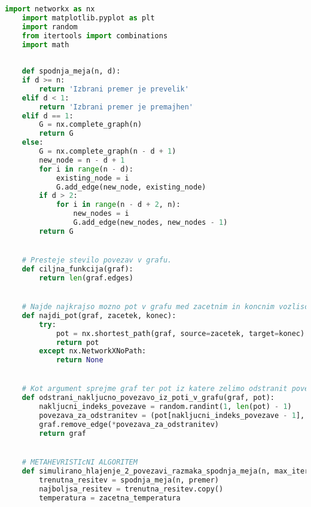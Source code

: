 \documentclass[12pt,a4paper]{amsart}
\theoremstyle{definition} %
\theoremstyle{plain} %
\begin{document}
\begin{lstlisting}[language=Python]
    import networkx as nx
    import matplotlib.pyplot as plt
    import random
    from itertools import combinations
    import math
    
    
    def spodnja_meja(n, d):
    if d >= n:
        return 'Izbrani premer je prevelik'
    elif d < 1:
        return 'Izbrani premer je premajhen'
    elif d == 1:
        G = nx.complete_graph(n)
        return G
    else:
        G = nx.complete_graph(n - d + 1)
        new_node = n - d + 1
        for i in range(n - d):
            existing_node = i
            G.add_edge(new_node, existing_node)
        if d > 2:
            for i in range(n - d + 2, n):
                new_nodes = i
                G.add_edge(new_nodes, new_nodes - 1)
        return G


    # Presteje stevilo povezav v grafu.
    def ciljna_funkcija(graf):
        return len(graf.edges)


    # Najde najkrajso mozno pot v grafu med zacetnim in koncnim vozliscem.
    def najdi_pot(graf, zacetek, konec):
        try:
            pot = nx.shortest_path(graf, source=zacetek, target=konec)
            return pot
        except nx.NetworkXNoPath:
            return None


    # Kot argument sprejme graf ter pot iz katere zelimo odstranit povezavo, nato iz nje nakljucno odstrani povezavo.
    def odstrani_nakljucno_povezavo_iz_poti_v_grafu(graf, pot):
        nakljucni_indeks_povezave = random.randint(1, len(pot) - 1)
        povezava_za_odstranitev = (pot[nakljucni_indeks_povezave - 1], pot[nakljucni_indeks_povezave])
        graf.remove_edge(*povezava_za_odstranitev)
        return graf


    # METAHEVRISTIcNI ALGORITEM 
    def simulirano_hlajenje_2_povezavi_razmaka_spodnja_meja(n, max_iteracij, zacetna_temperatura, stopnja_hlajenja, premer):
        trenutna_resitev = spodnja_meja(n, premer)
        najboljsa_resitev = trenutna_resitev.copy()
        temperatura = zacetna_temperatura


\end{lstlisting}
\end{document}
